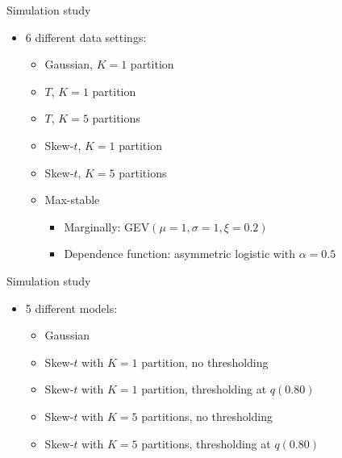 \documentclass{beamer}
\begin{document}
\begin{frame}{Simulation study}
  \begin{itemize} \setlength{\itemsep}{0.5em}
    \item 6 different data settings:
    \begin{itemize}
      \item Gaussian, $K = 1$ partition
      \item $T$, $K = 1$ partition
      \item $T$, $K = 5$ partitions
      \item Skew-$t$, $K = 1$ partition
      \item Skew-$t$, $K = 5$ partitions
      \item Max-stable
      \begin{itemize}
        \item Marginally: GEV$(\mu=1, \sigma=1, \xi=0.2)$
        \item Dependence function: asymmetric logistic with $\alpha = 0.5$
      \end{itemize}
    \end{itemize}
  \end{itemize}
\end{frame}

\begin{frame}{Simulation study}
  \begin{itemize} \setlength{\itemsep}{0.5em}
    \item 5 different models:
    \begin{itemize}
      \item Gaussian
      \item Skew-$t$ with $K = 1$ partition, no thresholding
      \item Skew-$t$ with $K = 1$ partition, thresholding at $q(0.80)$
      \item Skew-$t$ with $K = 5$ partitions, no thresholding
      \item Skew-$t$ with $K = 5$ partitions, thresholding at $q(0.80)$
    \end{itemize}
  \end{itemize}
\end{frame}

\end{document}
